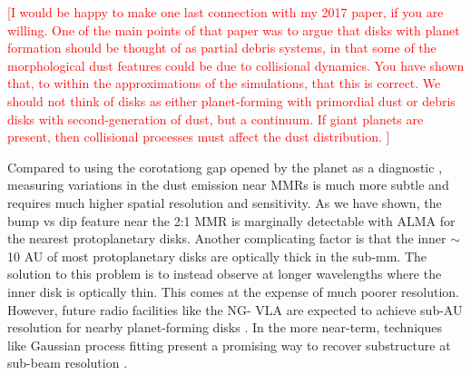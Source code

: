 \documentclass[twocolumn]{aastex63}
\newcommand{\ACBc}[1]{\textcolor{red}{#1}}
\begin{document}
\ACBc{[I would be happy to make one last connection with my 2017 paper, if you are willing.  One of the main points of that paper was to argue that disks with planet formation should be thought of as partial debris systems, in that some of the morphological dust features could be due to collisional dynamics.  You have shown that, to within the approximations of the simulations, that this is correct.  We should not think of disks as either planet-forming with primordial dust or debris disks with second-generation of dust, but a continuum.  If giant planets are present, then collisional processes must affect the dust distribution. ]}

Compared to using the corotationg gap opened by the planet as a diagnostic \citep{2013ApJ...777L..31D, 2016ApJ...820...29D}, measuring 
variations in the dust emission near MMRs is much more subtle and requires much higher spatial resolution and sensitivity. As we have shown, the 
bump vs dip feature near the 2:1 MMR is marginally detectable with ALMA for the nearest protoplanetary disks. Another complicating factor is that 
the inner $\sim$ 10 AU of most protoplanetary disks are optically thick in the sub-mm. The solution to this problem is to instead observe at longer 
wavelengths where the inner disk is optically thin. This comes at the expense of much poorer resolution. However, future radio facilities like the NG-
VLA are expected to achieve sub-AU resolution for nearby planet-forming disks \citep{2018ASPC..517..147R}. In the more near-term, techniques 
like Gaussian process fitting present a promising way to recover substructure at sub-beam resolution \citep{2020arXiv200507709J}.



\clearpage
\end{document}

